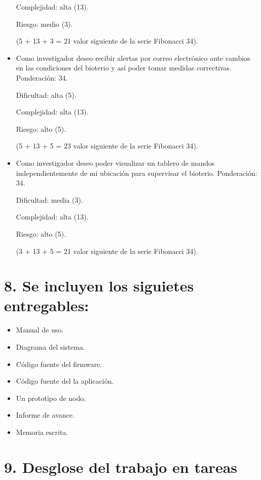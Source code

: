 \documentclass[
11pt, %
]{charter}
\begin{document}
\begin{itemize}
	Complejidad: alta (13).
	
	Riesgo: medio (3).
	
	(5 + 13 + 3 = 21 valor siguiente de la serie Fibonacci 34).
	
	\item Como investigador deseo recibir alertas por correo electrónico ante cambios en las condiciones del bioterio y así poder tomar medidas correctivas.
	Ponderación: 34.
	
	Dificultad: alta (5).
	
	Complejidad: alta (13).
	
	Riesgo: alto (5).
	
	(5 + 13 + 5 = 23 valor siguiente de la serie Fibonacci 34).
	
	\item Como investigador deseo poder visualizar un tablero de mandos independientemente de mi ubicación para supervisar el bioterio.
	Ponderación: 34.
	
	Dificultad: media (3).
	
	Complejidad: alta (13).
	
	Riesgo: alto (5).
	
	(3 + 13 + 5 = 21 valor siguiente de la serie Fibonacci 34).
	
\end{itemize}

\section{8. Se incluyen los siguietes entregables:}
\label{sec:entregables}

\begin{itemize}
	\item Manual de uso.
	\item Diagrama del sistema.
	\item Código fuente del firmware.
	\item Código fuente del la aplicación.
	\item Un prototipo de nodo.
	\item Informe de avance.
	\item Memoria escrita.
\end{itemize}

\section{9. Desglose del trabajo en tareas}
\label{sec:wbs}
\end{document}
